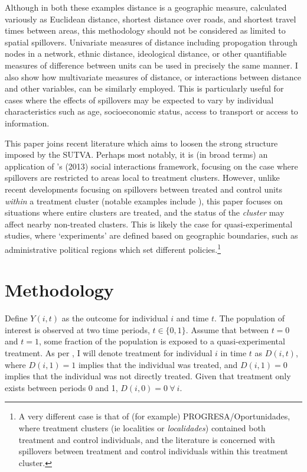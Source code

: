 Although in both these examples distance is a geographic measure, calculated
variously as Euclidean distance, shortest distance over roads, and shortest 
travel times between areas, this methodology should not be considered as limited 
to spatial spillovers.  Univariate measures of distance including propogation 
through nodes in a network, ethnic distance, ideological distance, or other 
quantifiable measures of difference between units can be used in precisely the 
same manner.  I also show how multivariate measures of distance, or interactions 
between distance and other variables, can be similarly employed.  This is 
particularly useful for cases where the effects of spillovers may be expected to 
vary by individual characteristics such as age, socioeconomic status, access to 
transport or access to information.

This paper joins recent literature which aims to loosen the strong structure 
imposed by the SUTVA.  Perhaps most notably, it is (in broad terms) an 
application of \citeauthor{Manski2013}'s (2013) social interactions framework, 
focusing on the case where spillovers are restricted to areas local to treatment 
clusters.  However, unlike recent developments focusing on spillovers 
between treated and control units \emph{within} a treatment cluster (notable
examples include \citet{McIntosh2008,Bairdetal2014,AngelucciDiMaro2010}), this 
paper focuses on situations where entire clusters are treated, and the status
of the \emph{cluster} may affect nearby non-treated clusters.  This is likely
the case for quasi-experimental studies, where `experiments' are defined based
on geographic boundaries, such as administrative political regions which set 
different policies.\footnote{A very different case is that of (for example)
PROGRESA/Oportunidades, where treatment clusters (ie localities or 
\emph{localidades}) contained both treatment and control individuals, and the
literature is concerned with spillovers between treatment and control individuals
within this treatment cluster.}

\nocite{AngelucciDeGiorgi2009} \nocite{Heckmanetal1998}
\nocite{MiguelKremer2004}
 \nocite{Heckmanetal1998b}

\section{Methodology}
Define $Y(i,t)$ as the outcome for individual $i$ and time $t$.  The population
of interest is observed at two time periods, $t\in \{0,1\}$. Assume that between
$t=0$ and $t=1$, some fraction of the population is exposed to a 
quasi-experimental treatment.  As per \citet{Abadie2005}, I will denote 
treatment for individual $i$ in time $t$ as $D(i,t)$, where $D(i,1)=1$ implies 
that the individual was treated, and $D(i,1)=0$ implies that the individual was
not directly treated.  Given that treatment only exists between periods 0 and 1,
$D(i,0)=0\ \forall\ i$.

